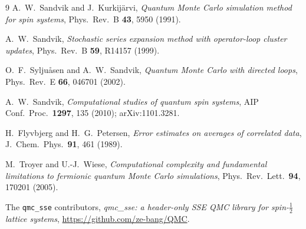 \documentclass[11pt,a4paper]{article}
\theoremstyle{definition}
\theoremstyle{plain}
\begin{document}
\begin{thebibliography}{9}
A.~W.~Sandvik and J.~Kurkij\"arvi,
\emph{Quantum Monte Carlo simulation method for spin systems},
Phys.~Rev.~B \textbf{43}, 5950 (1991).

A.~W.~Sandvik,
\emph{Stochastic series expansion method with operator-loop cluster
updates},
Phys.~Rev.~B \textbf{59}, R14157 (1999).

O.~F.~Syljuåsen and A.~W.~Sandvik,
\emph{Quantum Monte Carlo with directed loops},
Phys.~Rev.~E \textbf{66}, 046701 (2002).

A.~W.~Sandvik,
\emph{Computational studies of quantum spin systems},
AIP Conf.~Proc.~\textbf{1297}, 135 (2010); arXiv:1101.3281.

H.~Flyvbjerg and H.~G.~Petersen,
\emph{Error estimates on averages of correlated data},
J.~Chem.~Phys.~\textbf{91}, 461 (1989).

M.~Troyer and U.-J.~Wiese,
\emph{Computational complexity and fundamental limitations to fermionic
quantum Monte Carlo simulations},
Phys.~Rev.~Lett.~\textbf{94}, 170201 (2005).

The \texttt{qmc\_sse} contributors, \emph{qmc\_sse: a header-only SSE
QMC library for spin-$\tfrac12$ lattice systems}, \url{https://github.com/ze-bang/QMC}.

\end{thebibliography}
\end{document}
